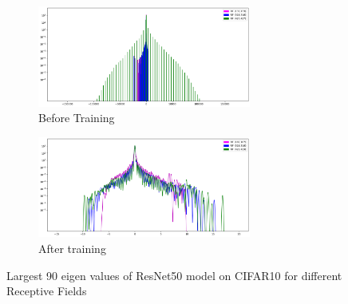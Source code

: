 \begin{figure}[h]
 \centering
     \begin{subfigure}[b]{0.45\textwidth}
    \includegraphics[width=7cm]{images/Hessian_spectre_resnet50_init_cifar10.png}
    \caption{Before Training}
    \label{subfig:}
     \end{subfigure}
      \hfill
     \begin{subfigure}[b]{0.45\textwidth}
    \includegraphics[width=7cm]{images/Hessian_spectre_resnet50_trained_cifar10.png}
    \caption{After training}
    \label{subfig:}
     \end{subfigure}
     \caption{Largest 90 eigen values of ResNet50 model on CIFAR10 for different Receptive Fields }
    \label{fig:hessian_resnet50_cifar10}
\end{figure}

